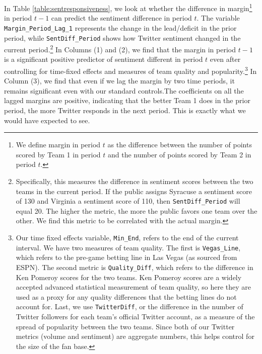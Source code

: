 \documentclass[12pt]{article}
\begin{document}
\begin{doublespacing}
In Table \ref{table:sentresponsiveness}, we look at whether the difference in margin\footnote{We define margin in period $t$ as the difference between the number of points scored by Team 1 in period $t$ and the number of points scored by Team 2 in period $t$.} in period $t-1 $ can predict the sentiment difference in period $t$. The variable \texttt{Margin\_Period\_Lag\_1} represents the change in the lead/deficit in the prior period, while \texttt{SentDiff\_Period} shows how Twitter sentiment changed in the current period.\footnote{Specifically, this measures the difference in sentiment scores between the two teams in the current period. If the public assigns Syracuse a sentiment score of 130 and Virginia a sentiment score of 110, then \texttt{SentDiff\_Period} will equal 20. The higher the metric, the more the public favors one team over the other. We find this metric to be correlated with the actual margin.} In Columns (1) and (2), we find that the margin in period $t-1$ is a significant positive predictor of sentiment different in period $t$ even after controlling for time-fixed effects and measures of team quality and popularity.\footnote{Our time fixed effects variable, \texttt{Min\_End}, refers to the end of the current interval. We have two measures of team quality. The first is \texttt{Vegas\_Line}, which refers to the pre-game betting line in Las Vegas (as sourced from ESPN). The second metric is \texttt{Quality\_Diff}, which refers to the difference in Ken Pomeroy scores for the two teams. Ken Pomeroy scores are a widely accepted advanced statistical measurement of team quality, so here they are used as a proxy for any quality differences that the betting lines do not account for. Last, we use \texttt{TwitterDiff}, or the difference in the number of Twitter followers for each team's official Twitter account, as a measure of the spread of popularity between the two teams. Since both of our Twitter metrics (volume and sentiment) are aggregate numbers, this helps control for the size of the fan base.} In Column (3), we find that even if we lag the margin by two time periods, it remains significant even with our standard controls.The coefficients on all the lagged margins are positive, indicating that the better Team 1 does in the prior period, the more Twitter responds in the next period. This is exactly what we would have expected to see. 


\end{doublespacing}
\end{document}

